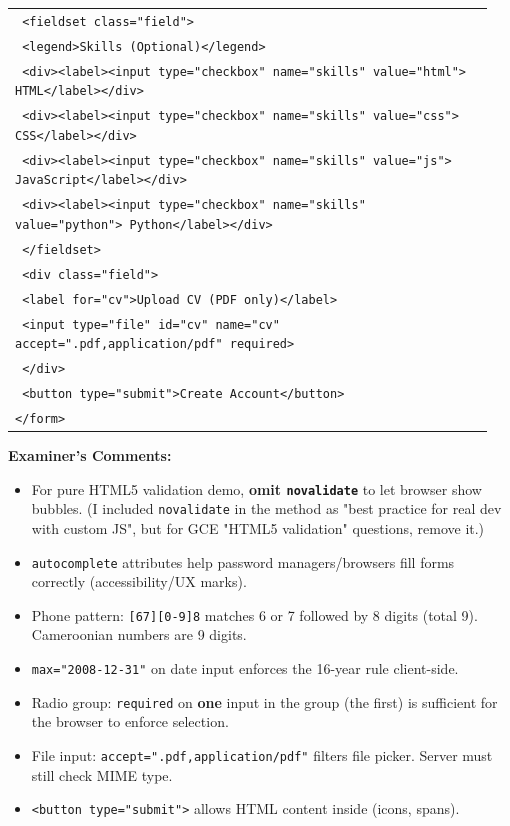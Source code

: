 \documentclass[11pt]{article}
\begin{document}
\begin{exoresolu}
\begin{center}
\begin{tabular}{|p{0.95\linewidth}|}
\texttt{  <fieldset class="field">}\\
\texttt{    <legend>Skills (Optional)</legend>}\\
\texttt{    <div><label><input type="checkbox" name="skills" value="html"> HTML</label></div>}\\
\texttt{    <div><label><input type="checkbox" name="skills" value="css"> CSS</label></div>}\\
\texttt{    <div><label><input type="checkbox" name="skills" value="js"> JavaScript</label></div>}\\
\texttt{    <div><label><input type="checkbox" name="skills" value="python"> Python</label></div>}\\
\texttt{  </fieldset>}\\
\texttt{  <div class="field">}\\
\texttt{    <label for="cv">Upload CV (PDF only)</label>}\\
\texttt{    <input type="file" id="cv" name="cv" accept=".pdf,application/pdf" required>}\\
\texttt{  </div>}\\
\texttt{  <button type="submit">Create Account</button>}\\
\texttt{</form>}\\\hline
\end{tabular}
\end{center}

\textbf{Examiner's Comments:}
\begin{itemize}
    \item For pure HTML5 validation demo, \textbf{omit \texttt{novalidate}} to let browser show bubbles. (I included \texttt{novalidate} in the method as "best practice for real dev with custom JS", but for GCE "HTML5 validation" questions, remove it.)
    \item \texttt{autocomplete} attributes help password managers/browsers fill forms correctly (accessibility/UX marks).
    \item Phone pattern: \texttt{[67][0-9]{8}} matches 6 or 7 followed by 8 digits (total 9). Cameroonian numbers are 9 digits.
    \item \texttt{max="2008-12-31"} on date input enforces the 16-year rule client-side.
    \item Radio group: \texttt{required} on \textbf{one} input in the group (the first) is sufficient for the browser to enforce selection.
    \item File input: \texttt{accept=".pdf,application/pdf"} filters file picker. Server must still check MIME type.
    \item \texttt{<button type="submit">} allows HTML content inside (icons, spans).
\end{itemize}
\end{exoresolu}
\end{document}
